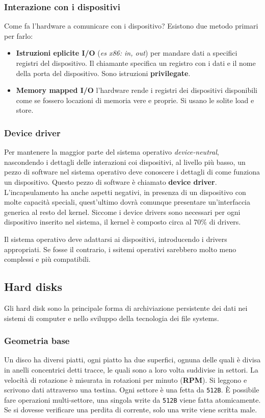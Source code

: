 \documentclass[12pt, twoside, letterpaper]{article}
\begin{document}
			\subsubsection{Interazione con i dispositivi}
				Come fa l'hardware a comunicare con i dispositivo? Esistono due metodo primari per farlo:
				\begin{itemize}
					\item \textbf{Istruzioni eplicite I/O} (\textit{es x86: in, out}) per mandare dati a specifici registri del dispositivo.  Il chiamante specifica un registro con i dati e il nome della porta del dispositivo. Sono istruzioni \textbf{privilegate}.
					\item \textbf{Memory mapped I/O} l'hardware rende i registri dei dispositivi disponibili come se fossero locazioni di memoria vere e proprie. Si usano le solite load e store.
				\end{itemize}
				
			\subsubsection{Device driver}
				Per mantenere la maggior parte del sistema operativo \textit{device-neutral}, nascondendo i dettagli delle interazioni coi dispositivi, al livello più basso, un pezzo di software nel sistema operativo deve conoscere i dettagli di come funziona un dispositivo. Questo pezzo di software è chiamato \textbf{device driver}. L'incapsulamento ha anche aspetti negativi, in presenza di un dispositivo con molte capacità speciali, quest'ultimo dovrà comunque presentare un'interfaccia generica al resto del kernel.
				Siccome i device drivers sono necessari per ogni dispositivo inserito nel sistema, il kernel è composto circa al 70\% di drivers.
				
				Il sistema operativo deve adattarsi ai dispositivi, introducendo i drivers appropriati. Se fosse il contrario, i ssitemi operativi sarebbero molto meno complessi e più compatibili.
				
		\subsection{Hard disks}
			Gli hard disk sono la principale forma di archiviazione persistente dei dati nei sistemi di computer e nello sviluppo della tecnologia dei file systems.
			
			\subsubsection{Geometria base}
				Un disco ha diversi piatti, ogni piatto ha due superfici, ognuna delle quali è divisa in anelli concentrici detti tracce, le quali sono a loro volta suddivise in settori. La velocità di rotazione è misurata in rotazioni per minuto (\textbf{RPM}). Si leggono e scrivono dati attraverso una testina.
				Ogni settore è una fetta da \texttt{512B}. È possibile fare operazioni multi-settore, una singola write da \texttt{512B} viene fatta atomicamente. Se si dovesse verificare una perdita di corrente, solo una write viene scritta male.
				
\end{document}
